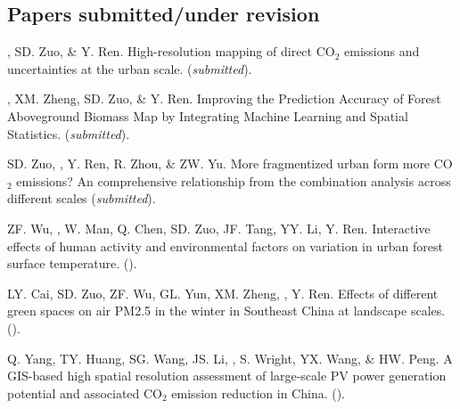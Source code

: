\subsection*{Papers submitted/under revision}
\begin{etaremune}
\item
    \Shaoqing, SD. Zuo, \& Y. Ren.
    High-resolution mapping of direct CO$_2$ emissions and uncertainties at the urban scale. 
    (\textit{submitted}).
\item
    \Shaoqing\CF, XM. Zheng, SD. Zuo, \& Y. Ren.
    Improving the Prediction Accuracy of Forest Aboveground Biomass Map by Integrating Machine Learning and Spatial Statistics. 
    (\textit{submitted}).
\item
    SD. Zuo, \Shaoqing, Y. Ren, R. Zhou, \&  ZW. Yu.
    More fragmentized urban form more CO$_2$ emissions? An comprehensive relationship from the combination analysis across different scales 
    (\textit{submitted}).
\item
    ZF. Wu, \Shaoqing, W. Man, Q. Chen, SD. Zuo, JF. Tang, YY. Li, Y. Ren.
    Interactive effects of human activity and environmental factors on variation in urban forest surface temperature. 
    (\Review).
\item
    LY. Cai, SD. Zuo, ZF. Wu, GL. Yun, XM. Zheng, \Shaoqing, Y. Ren.
    Effects of different green spaces on air PM2.5 in the winter in Southeast China at landscape scales.
    (\Review).
\item
    Q. Yang, TY. Huang, SG. Wang, JS. Li, \Shaoqing, S. Wright, YX. Wang, \& HW. Peng.
    A GIS-based high spatial resolution assessment of large-scale PV power generation potential and associated CO$_2$ emission reduction in China.
    (\Review).
\end{etaremune}
